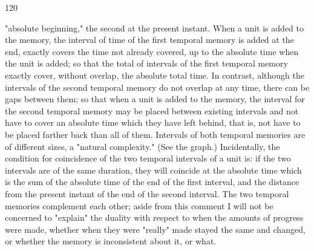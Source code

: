 \documentclass[10pt,twoside]{memoir}
\begin{document}
\begin{enumerate}
{\begin{enumerate}
\begin{sysrules}
\begin{sysrules}
\begin{sysrules}
\begin{sysrules}
{\begin{enumerate}
120 


"absolute beginning," the second at the present instant. When a unit is added 
to the memory, the interval of time of the first temporal memory is added at 
the end, exactly covers the time not already covered, up to the absolute time 
when the unit is added; so that the total of intervals of the first temporal 
memory exactly cover, without overlap, the absolute total time. In contrast, 
although the intervals of the second temporal memory do not overlap at any 
time, there can be gaps between them; so that when a unit is added to the 
memory, the interval for the second temporal memory may be placed 
between existing intervals and not have to cover an absolute time which they 
have left behind, that is, not have to be placed farther back than all of them. 
Intervals of both temporal memories are of different sizes, a "natural 
complexity." (See the graph.) Incidentally, the condition for coincidence of 
the two temporal intervals of a unit is: if the two intervals are of the same 
duration, they will coincide at the absolute time which is the sum of the 
absolute time of the end of the first interval, and the distance from the 
present instant of the end of the second interval. The two temporal 
memories complement each other; aside from this comment I will not be 
concerned to "explain" the duality with respect to when the amounts of 
progress were made, whether when they were "really" made stayed the same 
and changed, or whether the memory is inconsistent about it, or what. 


\end{enumerate}}
\end{sysrules}
\end{sysrules}
\end{sysrules}
\end{sysrules}
\end{enumerate}}
\end{enumerate}
\end{document}
